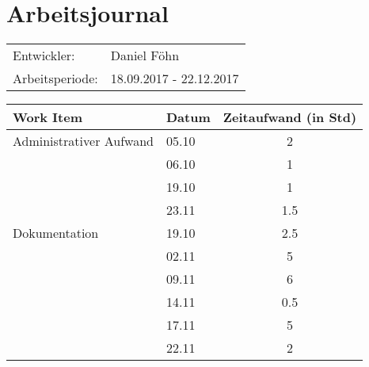 \documentclass[a4paper, 10pt, fleqn]{article}
\newcommand{\header}{\textbf{Work Item}&\textbf{Datum}&\textbf{Zeitaufwand (in Std)}\\\toprule}
\begin{document}
	\section*{Arbeitsjournal}
    \begin{tabular}{ll}
        Entwickler: & Daniel Föhn \\
        Arbeitsperiode: & 18.09.2017 - 22.12.2017\\
    \end{tabular}
		\begin{longtable}{p{9cm}|p{2cm}|c}
            \header

            Administrativer Aufwand & 05.10 & 2\\
            & 06.10 & 1\\
            & 19.10 & 1\\
            & 23.11 & 1.5\\
            
            Dokumentation & 19.10 & 2.5\\
            & 02.11 & 5\\
            & 09.11 & 6\\
            & 14.11 & 0.5\\
            & 17.11 & 5\\
            & 22.11 & 2\\
            

\end{longtable}
\end{document}
